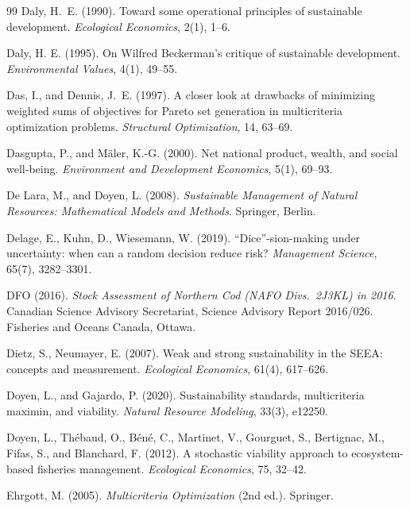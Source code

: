 \documentclass[preprint,11pt,authoryear]{elsarticle}
\theoremstyle{definition}
\theoremstyle{remark}
\begin{document}
\begin{thebibliography}{99}
 Daly, H.~E. (1990). Toward some operational principles of sustainable development. \emph{Ecological Economics}, 2(1), 1--6.

 Daly, H. E. (1995). On Wilfred Beckerman's critique of sustainable development. \emph{Environmental Values}, 4(1), 49--55.

 Das, I., and Dennis, J.~E. (1997). A closer look at drawbacks of minimizing weighted sums of objectives for Pareto set generation in multicriteria optimization problems. \emph{Structural Optimization}, 14, 63--69.

 Dasgupta, P., and M\"aler, K.-G. (2000). Net national product, wealth, and social well-being. \emph{Environment and Development Economics}, 5(1), 69--93.

 De Lara, M., and Doyen, L. (2008). \emph{Sustainable Management of Natural Resources: Mathematical Models and Methods}. Springer, Berlin.

 Delage, E., Kuhn, D., Wiesemann, W. (2019). ``Dice''-sion-making under uncertainty: when can a random decision reduce risk? \emph{Management Science}, 65(7), 3282--3301.

 DFO (2016). \emph{Stock Assessment of Northern Cod (NAFO Divs.\ 2J3KL) in 2016}. Canadian Science Advisory Secretariat, Science Advisory Report 2016/026. Fisheries and Oceans Canada, Ottawa.

 Dietz, S., Neumayer, E. (2007). Weak and strong sustainability in the SEEA: concepts and measurement. \emph{Ecological Economics}, 61(4), 617--626.

 Doyen, L., and Gajardo, P. (2020). Sustainability standards, multicriteria maximin, and viability. \emph{Natural Resource Modeling}, 33(3), e12250.

 Doyen, L., Th\'ebaud, O., B\'en\'e, C., Martinet, V., Gourguet, S., Bertignac, M., Fifas, S., and Blanchard, F. (2012). A stochastic viability approach to ecosystem-based fisheries management. \emph{Ecological Economics}, 75, 32--42.

 Ehrgott, M. (2005). \emph{Multicriteria Optimization} (2nd ed.). Springer.


\end{thebibliography}
\end{document}
